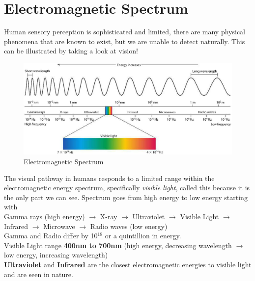 \documentclass{article}
\begin{document}
\section{Electromagnetic Spectrum}
Human sensory perception is sophisticated and limited, there are many physical phenomena that are known to exist, but we are unable to detect naturally. This can be illustrated by taking a look at vision! \\

\begin{figure}[htp]
\centering
\includegraphics[width=14cm]{images/electro.jpg}
\caption{Electromagnetic Spectrum}
\label{fig:Electromagnetic Spectrum}
\end{figure}

The visual pathway in humans responds to a limited range within the electromagnetic energy spectrum, specifically \textit{visible light}, called this because it is the only part we can see. Spectrum goes from high energy to low energy starting with \\
Gamma rays (high energy) $\rightarrow$ X-ray $\rightarrow$ Ultraviolet $\rightarrow$ Visible Light $\rightarrow$ Infrared $\rightarrow$ Microwave $\rightarrow$ Radio waves (low energy) \\
Gamma and Radio differ by 10$^18$ or a quintillion in energy. \\
Visible Light range \textbf{400nm to 700nm} (high energy, decreasing wavelength $\rightarrow$ low energy, increasing wavelength)\\
\textbf{Ultraviolet} and \textbf{Infrared} are the closest electromagnetic energies to visible light and are seen in nature. \\
\end{document}
